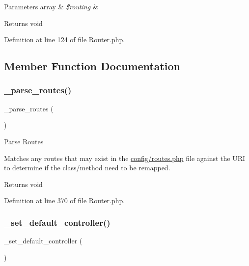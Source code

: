 \begin{DoxyParams}[1]{Parameters}
array & {\em \$routing} & \\
\hline
\end{DoxyParams}
\begin{DoxyReturn}{Returns}
void 
\end{DoxyReturn}


Definition at line 124 of file Router.\+php.



\subsection{Member Function Documentation}
\mbox{\label{class_c_i___router_a55a42fae865d03334b49baa5a5a6bd0b}} 
\subsubsection{\texorpdfstring{\_parse\_routes()}{\_parse\_routes()}}
{\footnotesize\ttfamily \+\_\+parse\+\_\+routes (\begin{DoxyParamCaption}{ }\end{DoxyParamCaption})\hspace{0.3cm}{\ttfamily [protected]}}

Parse Routes

Matches any routes that may exist in the \mbox{\hyperlink{routes_8php}{config/routes.\+php}} file against the U\+RI to determine if the class/method need to be remapped.

\begin{DoxyReturn}{Returns}
void 
\end{DoxyReturn}


Definition at line 370 of file Router.\+php.

\mbox{\label{class_c_i___router_a86b13067b062022251d2c7ecb4fb9492}} 
\subsubsection{\texorpdfstring{\_set\_default\_controller()}{\_set\_default\_controller()}}
{\footnotesize\ttfamily \+\_\+set\+\_\+default\+\_\+controller (\begin{DoxyParamCaption}{ }\end{DoxyParamCaption})\hspace{0.3cm}{\ttfamily [protected]}}

